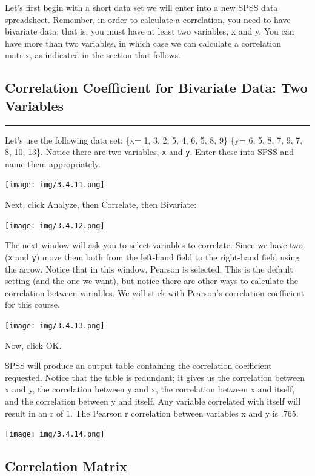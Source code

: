 \documentclass[]{book}
\begin{document}
Let's first begin with a short data set we will enter into a new SPSS
data spreadsheet. Remember, in order to calculate a correlation, you
need to have bivariate data; that is, you must have at least two
variables, x and y. You can have more than two variables, in which case
we can calculate a correlation matrix, as indicated in the section that
follows.

\subsection{Correlation Coefficient for Bivariate Data: Two
Variables}\label{correlation-coefficient-for-bivariate-data-two-variables}

\begin{center}\rule{0.5\linewidth}{0.5pt}\end{center}

Let's use the following data set: \{x= 1, 3, 2, 5, 4, 6, 5, 8, 9\} \{y=
6, 5, 8, 7, 9, 7, 8, 10, 13\}. Notice there are two variables,
\texttt{x} and \texttt{y}. Enter these into SPSS and name them
appropriately.

\texttt{[image: img/3.4.11.png]}

Next, click {Analyze}, then {Correlate}, then {Bivariate}:

\texttt{[image: img/3.4.12.png]}

The next window will ask you to select variables to correlate. Since we
have two (\texttt{x} and \texttt{y}) move them both from the left-hand
field to the right-hand field using the arrow. Notice that in this
window, {Pearson} is selected. This is the default setting (and the one
we want), but notice there are other ways to calculate the correlation
between variables. We will stick with Pearson's correlation coefficient
for this course.

\texttt{[image: img/3.4.13.png]}

Now, click {OK}.

SPSS will produce an output table containing the correlation coefficient
requested. Notice that the table is redundant; it gives us the
correlation between x and y, the correlation between y and x, the
correlation between x and itself, and the correlation between y and
itself. Any variable correlated with itself will result in an r of 1.
The Pearson r correlation between variables x and y is .765.

\texttt{[image: img/3.4.14.png]}

\subsection{Correlation Matrix}\label{correlation-matrix}
\end{document}
